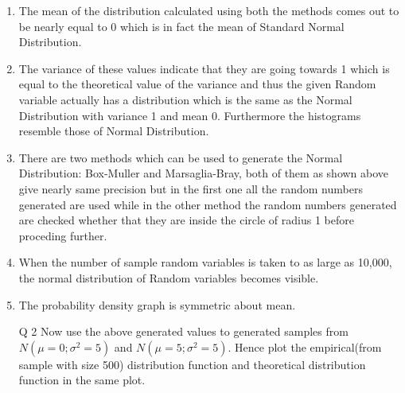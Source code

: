 \documentclass[12pt]{book}
\begin{document}
\begin{figure}[H]
	\centering
\end{figure}
\newpage
{}

\begin{enumerate}
\item The mean of the distribution calculated using both the methods comes out to be nearly equal to 0 which is in fact the mean of Standard Normal Distribution.
\item The variance of these values indicate that they are going towards 1 which is equal to the theoretical value of the variance and thus the given Random variable actually has a distribution which is the same as the Normal Distribution with variance 1 and mean 0. Furthermore the histograms resemble those of Normal Distribution.
\item There are two methods which can be used to generate the Normal Distribution: Box-Muller and Marsaglia-Bray, both of them as shown above give nearly same precision but in the first one all the random numbers generated are used while in the other method the random numbers generated are checked whether that they are inside the circle of radius 1 before proceding further.
\item When the number of sample random variables is taken to as large as 10,000, the normal distribution of Random variables becomes visible.
\item The probability density graph is symmetric about mean.
\end{enumerate}
\newpage
\begin{enumerate}
\item[Q 2] Now use the above generated values to generated samples from $N(\mu = 0;\sigma^2 = 5)$ and $N(\mu = 5;\sigma^2 = 5)$. Hence plot the empirical(from sample with size 500) distribution function and theoretical distribution function in the same plot.
\end{enumerate}
\end{document}
